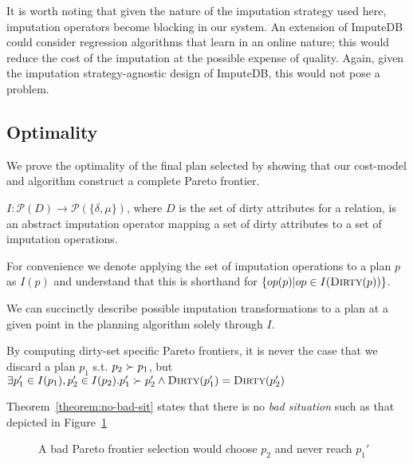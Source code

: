 It is worth noting that given the nature of the imputation strategy used here, imputation
operators become blocking in our system. An extension of ImputeDB could consider regression
algorithms that learn in an online nature; this would reduce the cost of the imputation at
the possible expense of quality. Again, given the imputation strategy-agnostic design of
ImputeDB, this would not pose a problem.

%    

\subsection{Optimality}
We prove the optimality of the final plan selected by showing that our cost-model and algorithm
construct a complete Pareto frontier.

\begin{definition}
$I: \mathcal{P}(D) \rightarrow \mathcal{P}(\{ \delta, \mu \})$, where
$D$ is the set of dirty attributes for a relation, is an abstract imputation operator mapping a set of dirty
attributes to a set of imputation operations.

For convenience we denote applying the set of imputation operations to a plan $p$ as $I(p)$ and understand that this
is shorthand for $\{ op(p)   | op \in I(\textsc{Dirty}(p)) \}$.
\end{definition}

We can succinctly describe possible imputation transformations to a plan at a given point in the planning algorithm solely through $I$.

\begin{theorem}\label{theorem:no-bad-sit}
By computing dirty-set specific Pareto frontiers, it is never the case that we discard a plan $p_1$ s.t. $p_2 \succ p_1$, but $\exists p_1' \in I(p_1), p_2' \in I(p_2). p_1' \succ p_2' \land \textsc{Dirty}(p_1') = \textsc{Dirty}(p_2')$
\end{theorem}

Theorem~\ref{theorem:no-bad-sit} states that there is no \textit{bad situation} such as that depicted in Figure~\ref{fig:bad-sit-diagram}

\begin{figure}
\centering
{}
\caption{A bad Pareto frontier selection would choose $p_2$ and never reach $p_1'$}
\label{fig:bad-sit-diagram}
\end{figure}

